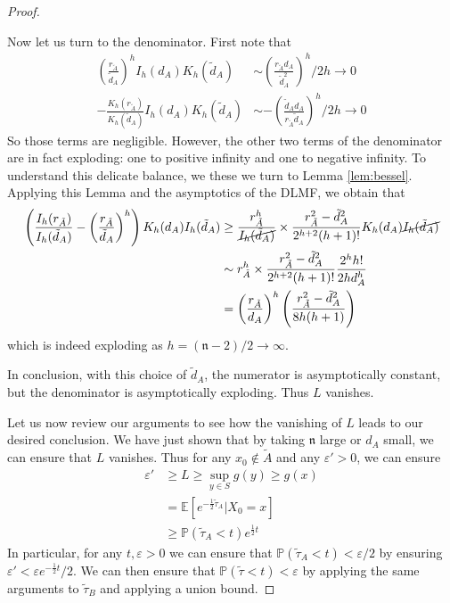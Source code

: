 \documentclass[english, aip, jcp, priprint, graphicx,floatfix]{revtex4-1}
\theoremstyle{plain}
\theoremstyle{definition}
\theoremstyle{plain}
\newcommand{\dimension}{{\mathfrak{n}}}
\begin{document}
\begin{proof}
\begin{itemize}
    Now let us turn to the denominator.  First note that 
    \begin{align*}
     \left( \frac{r_{\tilde{A}}}{\tilde{d}_A}\right)^h  
                I_h (d_A)K_h ( \tilde{d}_A) &\sim \left(\frac{r_{\tilde{A}} d_A}{\tilde d_A^2}\right)^h/2h \rightarrow 0\\
     - \frac{K_h ( r_{\tilde{A}})}{K_h ( \tilde{d}_A)} 
                I_h (d_A)K_h ( \tilde{d}_A) &\sim -\left(\frac{\tilde d_A d_A}{r_{\tilde A}\tilde d_A}\right)^h /2h\rightarrow 0
    \end{align*}
    So those terms are negligible.  However, the other two terms of the denominator are in fact exploding: one to positive infinity and one to negative infinity.  To understand this delicate balance, we these we turn to Lemma \ref{lem:bessel}.  Applying this Lemma and the asymptotics of the DLMF, we obtain that
    \begin{align*}
    \left( \frac{I_h ( r_{\tilde{A}})}{I_h ( \tilde{d}_A)} - \left(\frac{r_{\tilde{A}}}{\tilde{d}_A} \right)^h  \right)
                K_h ( d_A) I_h ( \tilde{d}_A) 
        &\geq \frac{r_{\tilde{A}}^h}{\cancel{I_h(\tilde{d}_A)}}\times\frac{r_{\tilde{A}}^{2} -\tilde{d}_A^{2}}{2^{h+2}(h+1)!} K_h ( d_A) \cancel{I_h ( \tilde{d}_A)} \\
        &\sim r_{\tilde{A}}^h\times\frac{r_{\tilde{A}}^{2} -\tilde{d}_A^{2}}{2^{h+2}(h+1)!} \frac{2^h h!}{2hd_A^h}  \\
        &=\left(\frac{r_{\tilde{A}}}{d_A} \right)^h \left(\frac{r_{\tilde A}^2 - \tilde d_A^2}{8h(h+1)}\right)
    \end{align*}
    which is indeed exploding as $h=(\dimension-2)/2 \rightarrow \infty$.  

    In conclusion, with this choice of $\tilde d_A$, the numerator is asymptotically constant, but the denominator is asymptotically exploding.  Thus $L$ vanishes.
\end{itemize}

Let us now review our arguments to see how the vanishing of $L$ leads to our desired conclusion.  We have just shown that by taking $\dimension$ large or $d_A$ small, we can ensure that $L$ vanishes.  Thus for any $x_0\notin \tilde A$ and any $\varepsilon'>0$, we can ensure
\begin{align*}
\varepsilon' & \geq L \geq \sup_{y \in S} g(y) \geq g(x) \\
            & = \mathbb{E}[e^{-\frac{1}{2}\tilde \tau_A}|X_0=x]\\
            & \geq \mathbb{P}(\tilde \tau_A < t) e^{\frac{1}{2} t}
\end{align*}
In particular, for any $t,\varepsilon>0$ we can ensure that $\mathbb{P}(\tilde \tau_A < t)<\varepsilon/2$ by ensuring $\varepsilon' < \varepsilon e^{-\frac{1}{2} t}/2$.  We can then ensure that $\mathbb{P}(\tilde \tau < t)<\varepsilon$ by applying the same arguments to $\tilde \tau_B$ and applying a union bound.

\end{proof}
\end{document}
